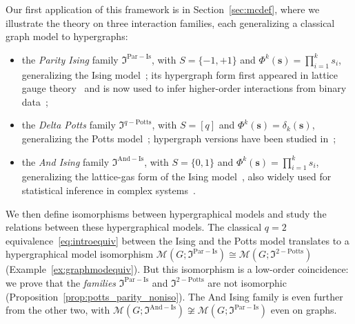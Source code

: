 \documentclass[11pt,reqno]{amsart}
\newcommand{\vecs}{\boldsymbol{s}}
\newcommand{\Mo}{\mathcal{M}}
\newcommand{\mci}{\mathfrak{I}^{\mathrm{Par-Is}}}
\newcommand{\mcp}{\mathfrak{I}^{q-\mathrm{Potts}}}
\newcommand{\mcpt}{\mathfrak{I}^{2-\mathrm{Potts}}}
\newcommand{\mca}{\mathfrak{I}^{\mathrm{And-Is}}}
\theoremstyle{plain}
\theoremstyle{definition}
\numberwithin{equation}{section}
\begin{document}
Our first application of this framework is in Section~\ref{sec:mcdef}, where we illustrate the theory on three interaction families, each generalizing a classical graph model to hypergraphs:
\begin{itemize}
    \item the \emph{Parity Ising} family $\mci$, with $S = \{-1, +1\}$ and $\Phi^k(\vecs) = \prod_{i=1}^k s_i$, generalizing the Ising model~\cite{LenzBeitragZV, isingBeitragZurTheorie1925}; its hypergraph form first appeared in lattice gauge theory~\cite{wegnerDualityGeneralizedIsing1971} and is now used to infer higher-order interactions from binary data~\cite{mastromatteo2013beyond, spinmod, clelbayes};
    \item the \emph{Delta Potts} family $\mcp$, with $S = [q]$ and $\Phi^k(\vecs) = \delta_k(\vecs)$, generalizing the Potts model~\cite{wu1982potts}; hypergraph versions have been studied in~\cite{grimmett1994potts, Berrekkal2026};
    \item the \emph{And Ising} family $\mca$, with $S = \{0,1\}$ and $\Phi^k(\vecs) = \prod_{i=1}^k s_i$, generalizing the lattice-gas form of the Ising model~\cite{lee1952statistical, Bax82}, also widely used for statistical inference in complex systems~\cite{Nguyen2017, jansma2025mereological}.
\end{itemize}
We then define isomorphisms between hypergraphical models and study the relations between these hypergraphical models. The classical $q=2$ equivalence~\eqref{eq:introequiv} between the Ising and the Potts model translates to a hypergraphical model isomorphism $\Mo(G; \mci) \cong \Mo(G; \mcpt)$ (Example~\ref{ex:graphmodequiv}). But this isomorphism is a low-order coincidence: we prove that the \emph{families} $\mci$ and $\mcpt$ are not isomorphic (Proposition~\ref{prop:potts_parity_noniso}). The And Ising family is even further from the other two, with $\Mo(G; \mca) \not\cong \Mo(G; \mci)$ even on graphs.
\end{document}
